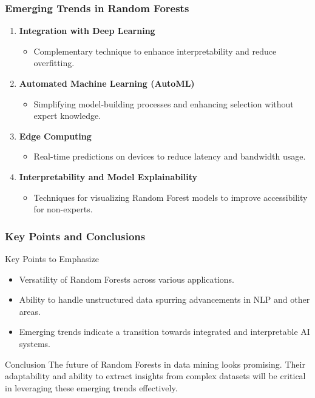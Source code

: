 \documentclass[aspectratio=169]{beamer}
\begin{document}
\begin{frame}[fragile]
    \frametitle{Emerging Trends in Random Forests}
    \begin{enumerate}
        \item \textbf{Integration with Deep Learning}
        \begin{itemize}
            \item Complementary technique to enhance interpretability and reduce overfitting.
        \end{itemize}

        \item \textbf{Automated Machine Learning (AutoML)}
        \begin{itemize}
            \item Simplifying model-building processes and enhancing selection without expert knowledge.
        \end{itemize}
    
        \item \textbf{Edge Computing}
        \begin{itemize}
            \item Real-time predictions on devices to reduce latency and bandwidth usage.
        \end{itemize}

        \item \textbf{Interpretability and Model Explainability}
        \begin{itemize}
            \item Techniques for visualizing Random Forest models to improve accessibility for non-experts.
        \end{itemize}
    \end{enumerate}
\end{frame}

\begin{frame}[fragile]
    \frametitle{Key Points and Conclusions}
    \begin{block}{Key Points to Emphasize}
        \begin{itemize}
            \item Versatility of Random Forests across various applications.
            \item Ability to handle unstructured data spurring advancements in NLP and other areas.
            \item Emerging trends indicate a transition towards integrated and interpretable AI systems.
        \end{itemize}
    \end{block}
    
    \begin{block}{Conclusion}
        The future of Random Forests in data mining looks promising. Their adaptability and ability to extract insights from complex datasets will be critical in leveraging these emerging trends effectively.
    \end{block}
\end{frame}
\end{document}
